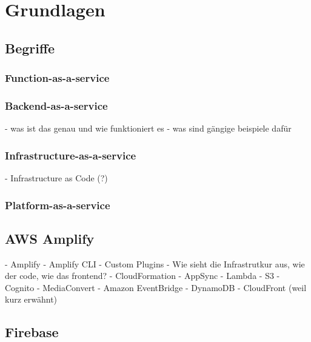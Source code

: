 \chapter{Grundlagen}

\section{Begriffe}
  \autocite{jiang2020overview}
  \autocite{kumar2019serverless}
  \autocite{dahunsi2021commercial}

  \subsection{Function-as-a-service}
  \subsection{Backend-as-a-service}
  - was ist das genau und wie funktioniert es
  - was sind gängige beispiele dafür
  \subsection{Infrastructure-as-a-service}
- Infrastructure as Code (?)

  \subsection{Platform-as-a-service}

\section{AWS Amplify}

\autocite{dahunsi2021commercial}
\autocite{amplifyDocs}
\autocite{lysakov2021security}
\autocite{mathew2014overview}
\autocite{beach2014aws}

  - Amplify
  - Amplify CLI
  - Custom Plugins
  - Wie sieht die Infrastrutkur aus, wie der code, wie das frontend?
  - CloudFormation
  - AppSync
  - Lambda
  - S3
  - Cognito
  - MediaConvert
  - Amazon EventBridge
  - DynamoDB
  - CloudFront (weil kurz erwähnt)

\section{Firebase}

\autocite{moroney2017definitive}
\autocite{firebaseDocs}
\autocite{tanna2018serverless}
